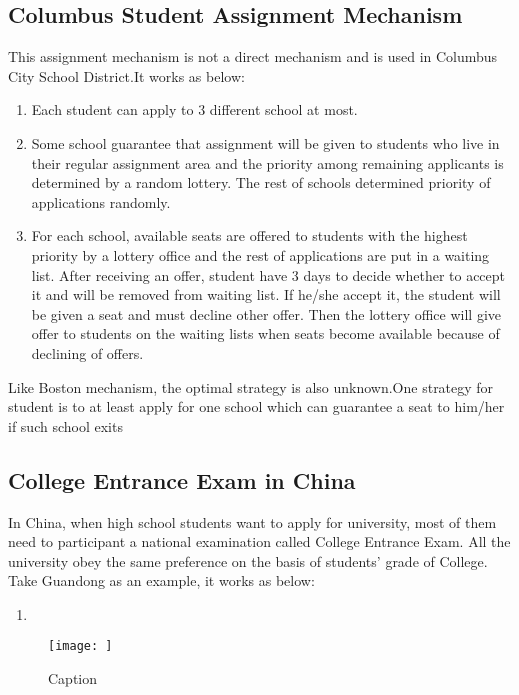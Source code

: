 \documentclass[12pt]{article}
\begin{document}
\subsection{Columbus Student Assignment Mechanism}
This assignment mechanism is not a direct mechanism and is used in Columbus City School District.It works as below:
\begin{enumerate}
    \item Each student can apply to 3 different school at most.
    \item Some school guarantee that assignment will be given to students who live in their regular assignment area and the priority among remaining applicants is determined by a random lottery. The rest of schools determined priority of applications randomly.
    \item For each school, available seats are offered to students with the highest priority by a lottery office and the rest of applications are put in a waiting list. After receiving an offer, student have 3 days to decide whether to accept it and will be removed from waiting list. If he/she accept it, the student will be given a seat and must decline other offer. Then the lottery office will give offer to students on the waiting lists when seats become available because of declining of offers.
\end{enumerate}
Like Boston mechanism, the optimal strategy is also unknown.One strategy for student is to at least apply for one school which can guarantee a seat to him/her if such school exits
\subsection{College Entrance Exam in China}
In China, when high school students want to apply for university, most of them need to participant a national examination called College Entrance Exam. All the university obey the same preference on the basis of students' grade of College. Take Guandong as an example, it works as below:
\begin{enumerate}
    \item 
\end{enumerate}
\begin{figure}
    \centering
    \texttt{[image: ]}
    \caption{Caption}
    \label{fig:my_label}
\end{figure}






\end{document}
